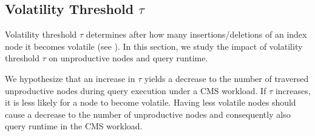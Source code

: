 \documentclass[abstracton,12pt]{scrartcl}
\theoremstyle{definition}
\begin{document}


\subsection{Volatility Threshold $\tau$}

\label{sec:threshold}

Volatility threshold $\tau$ determines after how many insertions/deletions of an index node
it becomes volatile (see ). In this section, we study the impact of
volatility threshold $\tau$ on unproductive nodes and query runtime.

We hypothesize that an increase in $\tau$ yields a decrease to the number of
traversed unproductive nodes during query execution under a CMS workload. If
$\tau$ increases, it is
less likely for a node to become volatile. Having less volatile nodes should
cause a decrease to the number of unproductive nodes and consequently also query
runtime in the CMS workload.

\end{document}

